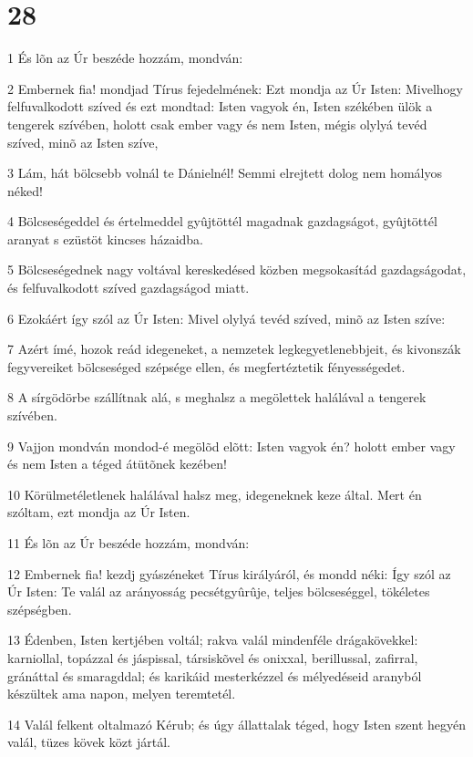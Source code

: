 \chapter{28}

\par 1 És lõn az Úr beszéde hozzám, mondván:
\par 2 Embernek fia! mondjad Tírus fejedelmének: Ezt mondja az Úr Isten: Mivelhogy felfuvalkodott szíved és ezt mondtad: Isten vagyok én, Isten székében ülök a tengerek szívében, holott csak ember vagy és nem Isten, mégis olylyá tevéd szíved, minõ az Isten szíve,
\par 3 Lám, hát bölcsebb volnál te Dánielnél! Semmi elrejtett dolog nem homályos néked!
\par 4 Bölcseségeddel és értelmeddel gyûjtöttél magadnak gazdagságot, gyûjtöttél aranyat s ezüstöt kincses házaidba.
\par 5 Bölcseségednek nagy voltával kereskedésed közben megsokasítád gazdagságodat, és felfuvalkodott szíved gazdagságod miatt.
\par 6 Ezokáért így szól az Úr Isten: Mivel olylyá tevéd szíved, minõ az Isten szíve:
\par 7 Azért ímé, hozok reád idegeneket, a nemzetek legkegyetlenebbjeit, és kivonszák fegyvereiket bölcseséged szépsége ellen, és megfertéztetik fényességedet.
\par 8 A sírgödörbe szállítnak alá, s meghalsz a megölettek halálával a tengerek szívében.
\par 9 Vajjon mondván mondod-é megölõd elõtt: Isten vagyok én? holott ember vagy és nem Isten a téged átütõnek kezében!
\par 10 Körülmetéletlenek halálával halsz meg, idegeneknek keze által. Mert én szóltam, ezt mondja az Úr Isten.
\par 11 És lõn az Úr beszéde hozzám, mondván:
\par 12 Embernek fia! kezdj gyászéneket Tírus királyáról, és mondd néki: Így szól az Úr Isten: Te valál az arányosság pecsétgyûrûje, teljes bölcseséggel, tökéletes szépségben.
\par 13 Édenben, Isten kertjében voltál; rakva valál mindenféle drágakövekkel: karniollal, topázzal és jáspissal, társiskõvel és onixxal, berillussal, zafirral, gránáttal és smaragddal; és karikáid mesterkézzel és mélyedéseid aranyból készültek ama napon, melyen teremtetél.
\par 14 Valál felkent oltalmazó Kérub; és úgy állattalak téged, hogy Isten szent hegyén valál, tüzes kövek közt jártál.
